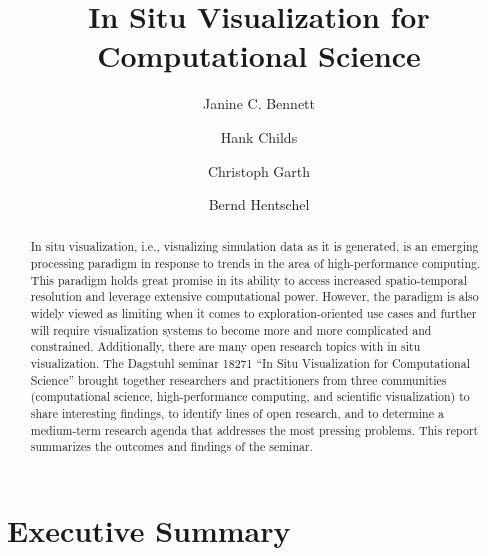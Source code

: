 \documentclass[a4paper,UKenglish]{dagrep}
\title{In Situ Visualization for Computational Science}
\author[1]{Janine C. Bennett}
\author[2]{Hank Childs}
\author[3]{Christoph Garth}
\author[4]{Bernd Hentschel}
\affil[1]{Sandia National Laboratories, Livermore}
\affil[2]{University of Oregon}
\affil[3]{Technische Universität Kaiserslautern}
\affil[4]{RWTH Aachen University}
\begin{document}
\maketitle

\begin{abstract}
In situ visualization, i.e., visualizing simulation data as it is generated, is an emerging processing paradigm in response to trends in the area of high-performance computing.  This paradigm holds great promise in its ability to access increased spatio-temporal resolution and leverage extensive computational power.  However, the paradigm is also widely viewed as limiting when it comes to exploration-oriented use cases and further will require visualization systems to become more and more complicated and constrained.  Additionally, there are many open research topics with in situ visualization. The Dagstuhl seminar 18271 ``In Situ Visualization for Computational Science'' brought together researchers and practitioners from three communities (computational science, high-performance computing, and scientific visualization) to share interesting findings, 
to identify lines of open research, and to determine a medium-term research agenda that addresses the most pressing problems. This report summarizes the outcomes and findings of the seminar.
\end{abstract}

\section{Executive Summary}

\license



\end{document}
